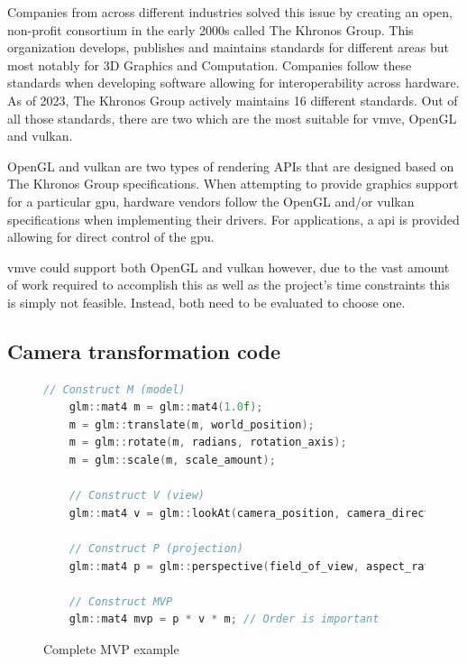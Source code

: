 \documentclass[11pt]{article}
\begin{document}
Companies from across different industries solved this issue by creating
an open, non-profit consortium in the early 2000s called The Khronos Group. This
organization develops, publishes and maintains standards for different areas
but most notably for 3D Graphics and Computation. Companies follow these 
standards when developing software allowing for interoperability across
hardware. As of 2023, The Khronos Group actively maintains 16 different
standards. Out of all those standards, there are two which are the most
suitable for \gls{vmve}, OpenGL and \gls{vulkan}.

OpenGL and \gls{vulkan} are two types of rendering APIs that are designed based on
The Khronos Group specifications. When attempting to provide graphics support
for a particular \gls{gpu}, hardware vendors follow the OpenGL and/or \gls{vulkan}
specifications when implementing their drivers. For applications, a
\acrfull{api} is provided allowing for direct control of the \gls{gpu}.

\gls{vmve} could support both OpenGL and \gls{vulkan} however, due to the vast
amount of work required to accomplish this as well as the project's time
constraints this is simply not feasible. Instead, both need to be evaluated to
choose one.


\subsection{Camera transformation code}
\begin{figure}[ht]
  \centering
  \begin{lstlisting}[language=C++]
    // Construct M (model)
    glm::mat4 m = glm::mat4(1.0f);
    m = glm::translate(m, world_position);   
    m = glm::rotate(m, radians, rotation_axis); 
    m = glm::scale(m, scale_amount);

    // Construct V (view)
    glm::mat4 v = glm::lookAt(camera_position, camera_direction, camera_up);

    // Construct P (projection)
    glm::mat4 p = glm::perspective(field_of_view, aspect_ratio, near, far);

    // Construct MVP
    glm::mat4 mvp = p * v * m; // Order is important

  \end{lstlisting}
  \caption{Complete MVP example}
  \label{fig:local_to_world_appendix}
\end{figure}
\end{document}
